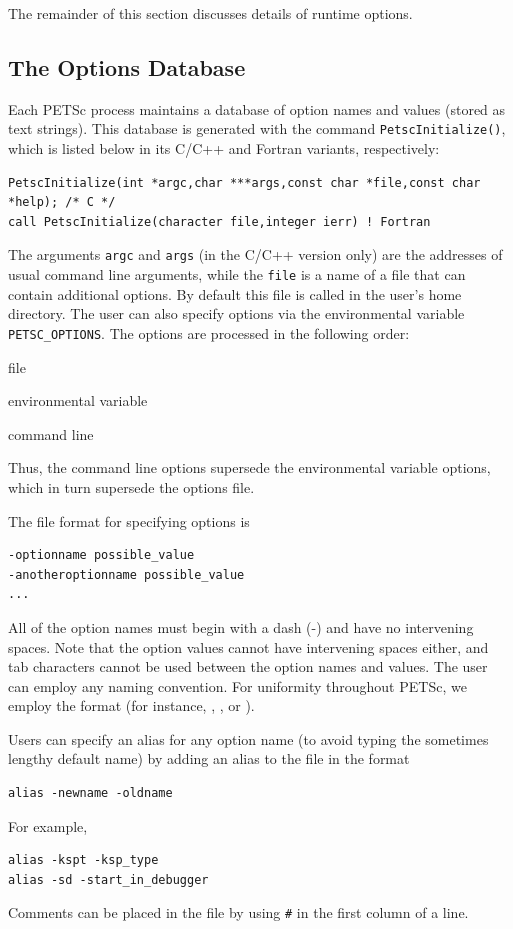 {{{The remainder of this section discusses details of runtime options.

\subsection{The Options Database}

Each PETSc process maintains a database of option names and values
(stored as text strings). This database is generated with the command
\lstinline{PetscInitialize()}, which is listed below in its C/C++ and
Fortran variants, respectively:
\begin{lstlisting}
PetscInitialize(int *argc,char ***args,const char *file,const char *help); /* C */
call PetscInitialize(character file,integer ierr) ! Fortran
\end{lstlisting}
The arguments \lstinline{argc} and \lstinline{args} (in the C/C++ version only) are
the addresses of usual command line arguments, while the \lstinline{file} is a name of
a file that can contain additional options.
By default this file is called   in the
user's home directory.  The user can also specify options via the
environmental variable \lstinline{PETSC_OPTIONS}.  
The options are processed in the following order:
\begin{tightenumerate}
\item file
\item environmental variable
\item command line
\end{tightenumerate}
Thus, the command line options supersede the environmental variable
options, which in turn supersede the options file.

The file format for specifying options is
\begin{lstlisting}
-optionname possible_value
-anotheroptionname possible_value
...
\end{lstlisting}
All of the option names must begin with a dash (-) and have no intervening
spaces.  Note that the option values cannot
have intervening spaces either, and tab characters cannot be used
between the option names and values.
The user can employ any naming convention.  For uniformity throughout
PETSc, we employ the format  (for instance,
, , or ).

Users can specify an alias for any option name (to avoid typing the
sometimes lengthy default name) by adding an alias to the
  file in the format
 
\begin{lstlisting}
alias -newname -oldname
\end{lstlisting}
For example,
\begin{lstlisting}
alias -kspt -ksp_type
alias -sd -start_in_debugger
\end{lstlisting}
Comments can be placed in the  file by using \lstinline{#} in the first column of a line.

}}}
